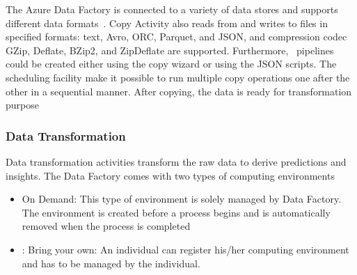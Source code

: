 \documentclass[9pt,twocolumn,twoside]{styles/osajnl}
\begin{document}
The Azure Data Factory is connected to a variety of data stores and supports different data formats~\cite{www-microsoft-azure-copy}. Copy Activity also reads from and writes to files in specified formats: text, Avro, ORC, Parquet, and JSON, and compression codec GZip, Deflate, BZip2, and ZipDeflate are supported. Furthermore,~\cite{www-microsoft-azure-copy} pipelines could be created either using the copy wizard or using the JSON scripts. The scheduling facility make it possible to run multiple copy operations one after the other in a sequential manner. After copying, the data is ready for transformation purpose

\subsubsection{Data Transformation}

Data transformation activities transform the raw data to derive predictions and insights. 
The Data Factory comes with two types of computing environments
\begin{itemize}
    \item On Demand: This type of environment is solely managed by Data Factory. The environment is created before a process begins and is automatically removed when the process is completed
    \item: Bring your own: An individual can register his/her computing environment and has to be managed by the individual.
\end{itemize}
\end{document}
